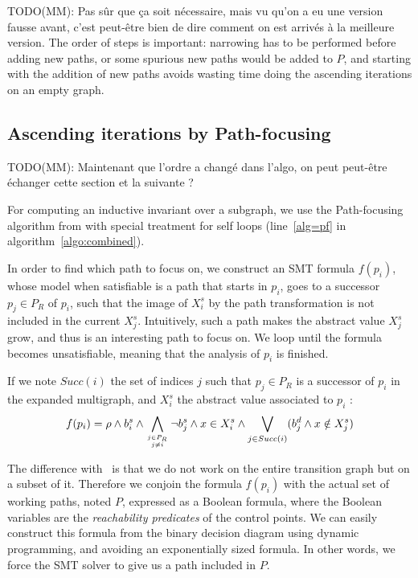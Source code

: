 \documentclass[preprint]{sigplanconf}
\newcommand{\MM}[1]{{\color{blue} TODO(MM): #1}}
\begin{document}
\MM{Pas sûr que ça soit nécessaire, mais vu qu'on a eu une version
  fausse avant, c'est peut-être bien de dire comment on est arrivés à
  la meilleure version.}
The order of steps is important: narrowing has to be performed before
adding new paths, or some spurious new paths would be added to $P$,
and starting with the addition of new paths avoids wasting time
doing the ascending iterations on an empty graph.

\subsection{Ascending iterations by Path-focusing}
\label{subsec:ascending}

\MM{Maintenant que l'ordre a changé dans l'algo, on peut peut-être
  échanger cette section et la suivante ?}

For computing an inductive invariant over a subgraph, we use the
Path-focusing algorithm from \citet{Monniaux_Gonnord_SAS11} with special
treatment for self loops (line~\ref{alg=pf} in algorithm~\ref{algo:combined}).

In order to find which path to focus on, we construct an SMT formula $f(p_i)$, whose
model when satisfiable is a path that starts in $p_i$, goes to a successor $p_j
\in P_R$ of $p_i$, such that the image of $X_{i}^s$ by the path transformation
is not included in the current $X_{j}^s$.
Intuitively, such a path makes the abstract value $X_{j}^s$ grow, and thus is
an interesting path to focus on. We loop until the formula becomes unsatisfiable,
meaning that the analysis of $p_i$ is finished.

If we note $Succ(i)$ the set of indices $j$ such that $p_j \in P_R$ is a
successor of $p_i$ in the expanded multigraph, and $X_i^s$ the abstract value
associated to $p_i$ :
$$f(p_i) = \rho \wedge b_i^s \wedge 
\displaystyle\bigwedge_{j \in P_R \atop j \neq i} \neg
b_j^s \wedge x \in X_i^s \wedge \displaystyle\bigvee_{j \in Succ(i)} (b_j^d \wedge
x \notin X_j^s)$$

The difference with~\citet{Monniaux_Gonnord_SAS11} is that we do not
work on the entire transition graph but on a subset of it. Therefore we
conjoin the formula $f(p_i)$ with the actual set of working paths,
noted $P$, expressed as a Boolean formula, where the Boolean variables are the
\emph{reachability predicates} of the control points. We can easily construct
this formula from the binary decision diagram using dynamic programming, and
avoiding an exponentially sized formula. In other words, we force the SMT solver
to give us a path included in $P$.
\end{document}
